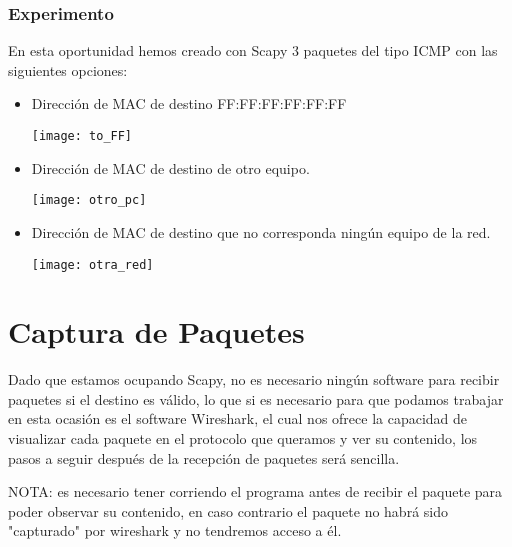 \documentclass[spanish]{udpreport}
\begin{document}
\begin{enumerate}
\subsection{Experimento}

\par En esta oportunidad hemos creado con Scapy 3 paquetes del tipo ICMP con las siguientes opciones:
	\begin{itemize}
		\item Dirección de MAC de destino FF:FF:FF:FF:FF:FF
        \\[2ex]
        \par \texttt{[image: to\_FF]}
        \newpage        
		\item  Dirección de MAC de destino de otro equipo.
        \\[2ex]
        \par \texttt{[image: otro\_pc]}
        \\[2ex]
		\item Dirección de MAC de destino que no corresponda ningún equipo de la red.
        \\[2ex]
        \par \texttt{[image: otra\_red]}
        
	\end{itemize}
    

\end{enumerate}

\chapter{Captura de Paquetes}
	\par Dado que estamos ocupando Scapy, no es necesario ningún software para recibir paquetes si el destino es válido, lo que si es necesario para que podamos trabajar en esta ocasión es el software Wireshark, el cual nos ofrece la capacidad de visualizar cada paquete en el protocolo que queramos y ver su contenido, los pasos a seguir después de la recepción de paquetes será sencilla.
   \par NOTA: es necesario tener corriendo el programa antes de recibir el paquete para poder observar su contenido, en caso contrario el paquete no habrá sido "capturado" por wireshark y no tendremos acceso a él.
\end{document}

